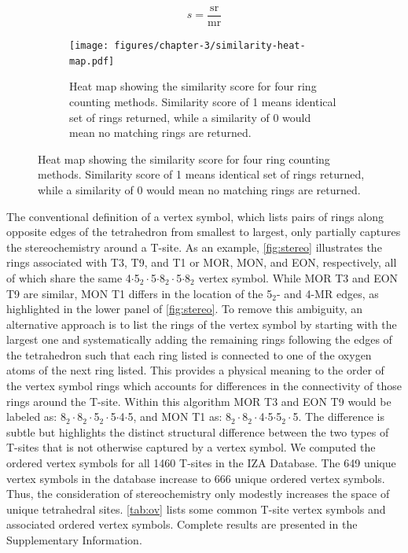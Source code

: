 \documentclass[preprint,numrefs,noinfo,sort&compress]{elsarticle}
\begin{document}
\begin{equation}\label{eq:similarity}
s = \mathrm{ \frac{sr}{mr} }
\end{equation}

\begin{figure}
\begin{figure}[H]
\centering
\texttt{[image: figures/chapter-3/similarity-heat-map.pdf]}
\caption{Heat map showing the similarity score for four ring counting methods. Similarity score of 1 means identical set of rings returned, while a similarity of 0 would mean no matching rings are returned. \label{fig:similarity}}
\end{figure}
\end{figure}

The conventional definition of a vertex symbol, which lists pairs of rings along opposite edges of the tetrahedron from smallest to largest, only partially captures  the stereochemistry around a T-site. As an example, \cref{fig:stereo} illustrates the rings associated  with T3, T9, and T1 or MOR, MON, and EON, respectively, all of which share the same 4\(\cdot\)5\(_{\text{2}} \cdot\)5\(\cdot\)8\(_{\text{2}} \cdot\)5\(\cdot\)8\(_{\text{2}}\) vertex symbol. While MOR T3 and EON T9 are similar, MON T1 differs in the location of the 5\(_{\text{2}}\)- and 4-MR edges, as highlighted in the lower panel of \cref{fig:stereo}. To remove this ambiguity, an alternative approach is to list the rings of the vertex symbol by starting with the largest one and systematically adding the remaining rings following the edges of the tetrahedron such that each ring listed is connected to one of the oxygen atoms of the next ring listed. This provides a physical meaning to the order of the vertex symbol rings which accounts for differences in the connectivity of those rings around the T-site. Within this algorithm MOR T3 and EON T9 would be labeled as: 8\(_{\text{2}} \cdot\)8\(_{\text{2}} \cdot\)5\(_{\text{2}} \cdot\)5\(\cdot\)4\(\cdot\)5, and MON T1 as: 8\(_{\text{2}} \cdot\)8\(_{\text{2}} \cdot\)4\(\cdot\)5\(\cdot\)5\(_{\text{2}} \cdot\)5. The difference is subtle but highlights the distinct structural difference between the two types of T-sites that is not otherwise captured by a vertex symbol.  We computed the ordered vertex symbols for  all 1460 T-sites in the IZA Database.  The 649 unique vertex symbols in the database increase to 666 unique ordered vertex symbols. Thus, the consideration of stereochemistry only modestly increases the space of unique  tetrahedral sites.  \cref{tab:ov}  lists some common T-site vertex symbols and associated ordered vertex symbols. Complete results are presented in the Supplementary Information.
\end{document}
